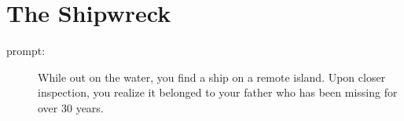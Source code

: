 \section*{The Shipwreck}

\begin{description}
\item[prompt:] While out on the water, you find a ship on a remote island. Upon closer inspection, you realize it belonged to your father who has been missing for over 30 years.
\end{description}
